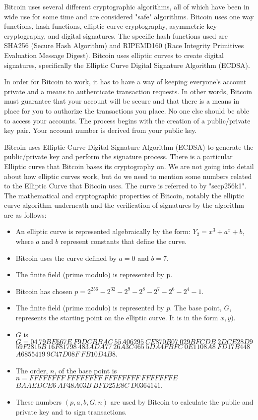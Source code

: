 \documentclass{article}
\begin{document}
	Bitcoin uses several different cryptographic algorithms, all of which have been in wide use for some time and are considered "safe" algorithms. Bitcoin uses one way functions, hash functions, elliptic curve cryptography, asymmetric key cryptography, and digital signatures. The specific hash functions used are SHA256 (Secure Hash Algorithm) and RIPEMD160 (Race Integrity Primitives Evaluation Message Digest). Bitcoin uses elliptic curves to create digital signatures, specifically the Elliptic Curve Digital Signature Algorithm (ECDSA).
	
	In order for Bitcoin to work, it has to have a way of keeping everyone's account private and a means to authenticate transaction requests. In other words, Bitcoin must guarantee that your account will be secure and that there is a means in place for you to authorize the transactions you place. No one else should be able to access your accounts. The process begins with the creation of a public/private key pair. Your account number is derived from your public key.
	
	Bitcoin uses Elliptic Curve Digital Signature Algorithm (ECDSA) to generate the public/private key and perform the signature process. There is a particular Elliptic curve that Bitcoin bases its cryptography on. We are not going into detail about how elliptic curves work, but do we need to mention some numbers related to the Elliptic Curve that Bitcoin uses. The curve is referred to by "secp256k1". The mathematical and cryptographic properties of Bitcoin, notably the elliptic curve algorithm underneath and the verification of signatures by the algorithm are as follows:\

\begin{itemize}
\item An elliptic curve is represented algebraically by the form: \(Y_2 = x^3 + a^x + b\), where \(a\) and \(b\) represent constants that define the curve.
\item Bitcoin uses the curve defined by \(a = 0\) and \(b = 7\).
\item The finite field (prime modulo) is represented by p.
\item Bitcoin has chosen $p = 2^{256}-2^{32}-2^9-2^8-2^7-2^6-2^{4}-1$.
\item The finite field (prime modulo) is represented by $p$. 
The base point, \(G\), represents the starting point on the elliptic curve. It is in the form \(x, y)\).
\item $G$ is $G=04\ 79BE667E\ F9DCBBAC\ 55A06295\ CE870B07\ 029BFCDB\ 2DCE28D9$\\$59F2815B\ 16F81798\ 483ADA77\ 26A3C465\ 5DA4FBFC\ 0E1108A8\ FD17B448$\\$A6855419\ 9C47D08F\ FB10D4B8$.
\item The order, \(n\), of the base point is $n=FFFFFFFF\ FFFFFFFF\ FFFFFFFF\ FFFFFFFE$\\$BAAEDCE6\ AF48A03B\ BFD25E8C\ D0364141$.
\item These numbers \((p, a, b, G, n)\) are used by Bitcoin to calculate the public and private key and to sign transactions.
\end{itemize}
\end{document}

